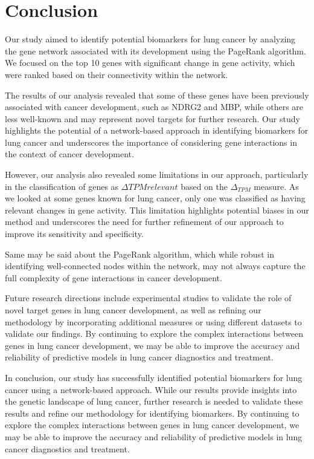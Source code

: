 \section{Conclusion} \label{sec:conclusion}
Our study aimed to identify potential biomarkers for lung cancer by analyzing the gene network associated with its development
using the PageRank algorithm.
We focused on the top 10 genes with significant change in gene activity,
which were ranked based on their connectivity within the network.

The results of our analysis revealed that some of these genes have been previously associated with cancer development,
such as NDRG2 and MBP, while others are less well-known and may represent novel targets for further research.
Our study highlights the potential of a network-based approach in identifying biomarkers for lung cancer and
underscores the importance of considering gene interactions in the context of cancer development.


However, our analysis also revealed some limitations in our approach,
particularly in the classification of genes as $\Delta TPM relevant$ based on the $\Delta_{TPM}$ measure.
As we looked at some genes known for lung cancer, only one was classified as having relevant changes in gene activity.
This limitation highlights potential biases in our method and
underscores the need for further refinement of our approach to improve its sensitivity and specificity.


Same may be said about the PageRank algorithm, which while robust in identifying well-connected nodes within the network,
may not always capture the full complexity of gene interactions in cancer development.


Future research directions include experimental studies to validate the role of novel target genes in lung cancer development,
as well as refining our methodology by incorporating additional measures or
using different datasets to validate our findings.
By continuing to explore the complex interactions between genes in lung cancer development,
we may be able to improve the accuracy and reliability of predictive models in lung cancer diagnostics and treatment.

In conclusion, our study has successfully identified potential biomarkers for lung cancer using a network-based approach.
While our results provide insights into the genetic landscape of lung cancer,
further research is needed to validate these results and refine our methodology for identifying biomarkers.
By continuing to explore the complex interactions between genes in lung cancer development,
we may be able to improve the accuracy and reliability of predictive models in lung cancer diagnostics and treatment.